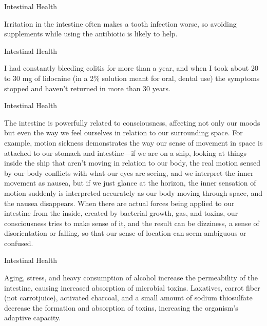 \documentclass[11pt,oneside,openany,extrafontsizes]{memoir}
\begin{document}
\begin{standalonequote}{Intestinal Health}

    \begin{answer}
      Irritation in the intestine often makes a tooth infection worse, so avoiding supplements while using the antibiotic is likely to help.
    \end{answer}
\end{standalonequote}

\begin{qaexchange}{Intestinal Health}

    \begin{answer}
      I had constantly bleeding colitis for more than a year, and when I took about 20 to 30 mg of lidocaine (in a 2\% solution meant for oral, dental use) the symptoms stopped and haven't returned in more than 30 years.
    \end{answer}
\end{qaexchange}

\begin{standalonequote}{Intestinal Health}

    \begin{answer}
      The intestine is powerfully related to consciousness, affecting not only our moods but even the way we feel ourselves in relation to our surrounding space. For example, motion sickness demonstrates the way our sense of movement in space is attached to our stomach and intestine—if we are on a ship, looking at things inside the ship that aren't moving in relation to our body, the real motion sensed by our body conflicts with what our eyes are seeing, and we interpret the inner movement as nausea, but if we just glance at the horizon, the inner sensation of motion suddenly is interpreted accurately as our body moving through space, and the nausea disappears. When there are actual forces being applied to our intestine from the inside, created by bacterial growth, gas, and toxins, our consciousness tries to make sense of it, and the result can be dizziness, a sense of disorientation or falling, so that our sense of location can seem ambiguous or confused.
    \end{answer}
\end{standalonequote}

\begin{standalonequote}{Intestinal Health}

    \begin{answer}
      Aging, stress, and heavy consumption of alcohol increase the permeability of the intestine, causing increased absorption of microbial toxins. Laxatives, carrot fiber (not carrotjuice), activated charcoal, and a small amount of sodium thiosulfate decrease the formation and absorption of toxins, increasing the organism's adaptive capacity.
    \end{answer}
\end{standalonequote}
\end{document}

